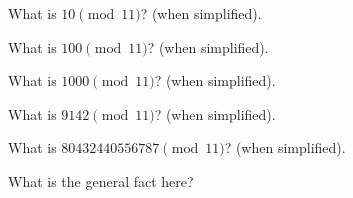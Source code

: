 \mbox{}
  \begin{myenum}  
  \item What is $10 \pmod{11}$? (when simplified).
  \item What is $100 \pmod{11}$? (when simplified).
  \item What is $1000 \pmod{11}$? (when simplified).
  \item What is $9142 \pmod{11}$? (when simplified).  
  \item What is $80432440556787 \pmod{11}$? (when simplified).
  \item What is the general fact here?
  \end{myenum}
